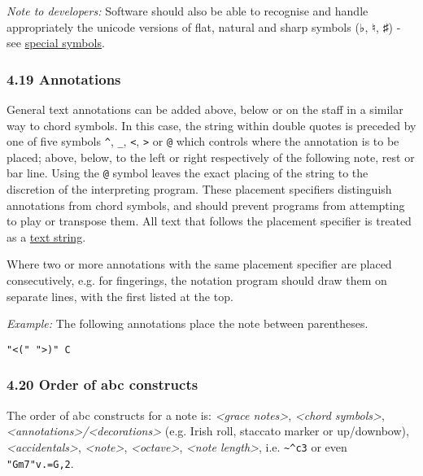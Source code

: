 \emph{Note to developers:} Software should also be able to recognise and
handle appropriately the unicode versions of flat, natural and sharp
symbols (♭, ♮, ♯) - see \protect\hyperlink{special_symbols}{special
symbols}.

\hypertarget{annotations}{\subsubsection{4.19
Annotations}\label{annotations}}

General text annotations can be added above, below or on the staff in a
similar way to chord symbols. In this case, the string within double
quotes is preceded by one of five symbols \texttt{\^{}}, \texttt{\_},
\texttt{\textless{}}, \texttt{\textgreater{}} or \texttt{@} which
controls where the annotation is to be placed; above, below, to the left
or right respectively of the following note, rest or bar line. Using the
\texttt{@} symbol leaves the exact placing of the string to the
discretion of the interpreting program. These placement specifiers
distinguish annotations from chord symbols, and should prevent programs
from attempting to play or transpose them. All text that follows the
placement specifier is treated as a
\protect\hyperlink{text_string_definition}{text string}.

Where two or more annotations with the same placement specifier are
placed consecutively, e.g. for fingerings, the notation program should
draw them on separate lines, with the first listed at the top.

\emph{Example:} The following annotations place the note between
parentheses.

\begin{verbatim}
"<(" ">)" C
\end{verbatim}

\hypertarget{order_of_abc_constructs}{\subsubsection{4.20 Order of abc
constructs}\label{order_of_abc_constructs}}

The order of abc constructs for a note is: \emph{\textless{}grace
notes\textgreater{}}, \emph{\textless{}chord symbols\textgreater{}},
\emph{\textless{}annotations\textgreater{}/\textless{}decorations\textgreater{}}
(e.g. Irish roll, staccato marker or up/downbow),
\emph{\textless{}accidentals\textgreater{}},
\emph{\textless{}note\textgreater{}},
\emph{\textless{}octave\textgreater{}}, \emph{\textless{}note
length\textgreater{}}, i.e.
\texttt{\textasciitilde{}\^{}c\textquotesingle{}3} or even
\texttt{"Gm7"v.=G,2}.

